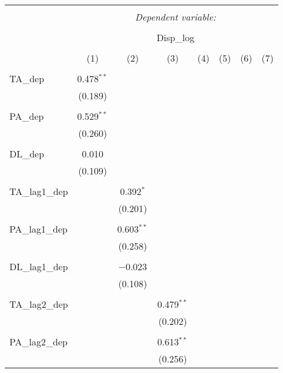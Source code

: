 
\begin{table}[!htbp] \centering 
  \caption{} 
  \label{} 
\begin{tabular}{@{\extracolsep{5pt}}lccccccc} 
\\[-1.8ex]\hline 
\hline \\[-1.8ex] 
 & \multicolumn{7}{c}{\textit{Dependent variable:}} \\ 
\cline{2-8} 
\\[-1.8ex] & \multicolumn{7}{c}{Disp\_log} \\ 
\\[-1.8ex] & (1) & (2) & (3) & (4) & (5) & (6) & (7)\\ 
\hline \\[-1.8ex] 
 TA\_dep & 0.478$^{**}$ &  &  &  &  &  &  \\ 
  & (0.189) &  &  &  &  &  &  \\ 
  & & & & & & & \\ 
 PA\_dep & 0.529$^{**}$ &  &  &  &  &  &  \\ 
  & (0.260) &  &  &  &  &  &  \\ 
  & & & & & & & \\ 
 DL\_dep & 0.010 &  &  &  &  &  &  \\ 
  & (0.109) &  &  &  &  &  &  \\ 
  & & & & & & & \\ 
 TA\_lag1\_dep &  & 0.392$^{*}$ &  &  &  &  &  \\ 
  &  & (0.201) &  &  &  &  &  \\ 
  & & & & & & & \\ 
 PA\_lag1\_dep &  & 0.603$^{**}$ &  &  &  &  &  \\ 
  &  & (0.258) &  &  &  &  &  \\ 
  & & & & & & & \\ 
 DL\_lag1\_dep &  & $-$0.023 &  &  &  &  &  \\ 
  &  & (0.108) &  &  &  &  &  \\ 
  & & & & & & & \\ 
 TA\_lag2\_dep &  &  & 0.479$^{**}$ &  &  &  &  \\ 
  &  &  & (0.202) &  &  &  &  \\ 
  & & & & & & & \\ 
 PA\_lag2\_dep &  &  & 0.613$^{**}$ &  &  &  &  \\ 
  &  &  & (0.256) &  &  &  &  \\ 

\end{tabular}
\end{table}
